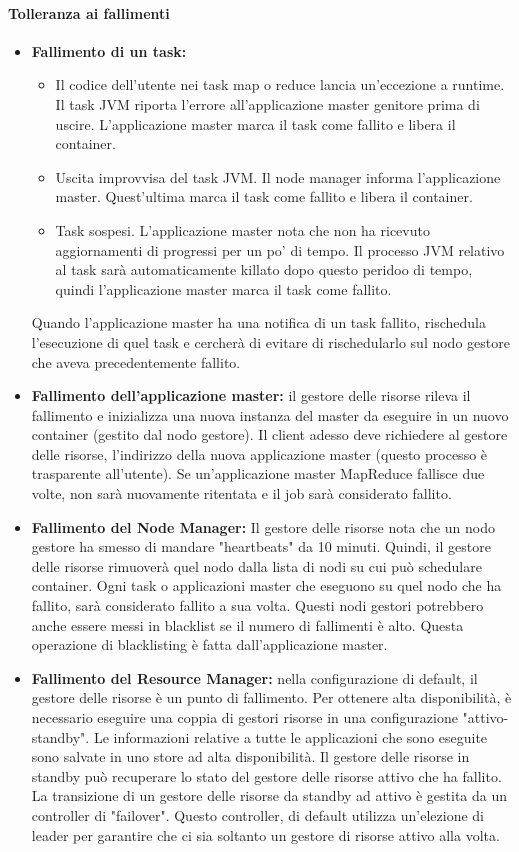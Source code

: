 \documentclass{article}
\begin{document}
\begin{appendices}
\paragraph{Tolleranza ai fallimenti}
\begin{itemize}
    \item \textbf{Fallimento di un task:} 
    \begin{itemize}
        \item Il codice dell'utente nei task map o reduce lancia un'eccezione a runtime. Il task JVM riporta l'errore all'applicazione master genitore prima di uscire. L'applicazione master marca il task come fallito e libera il container.
        \item Uscita improvvisa del task JVM. Il node manager informa l'applicazione master. Quest'ultima marca il task come fallito e libera il container.
        \item Task sospesi. L'applicazione master nota che non ha ricevuto aggiornamenti di progressi per un po' di tempo. Il processo JVM relativo al task sarà automaticamente killato dopo questo peridoo di tempo, quindi l'applicazione master marca il task come fallito.
    \end{itemize}
    Quando l'applicazione master ha una notifica di un task fallito, rischedula l'esecuzione di quel task e cercherà di evitare di rischedularlo sul nodo gestore che aveva precedentemente fallito.
    \item \textbf{Fallimento dell'applicazione master:} il gestore delle risorse rileva il fallimento e inizializza una nuova instanza del master da eseguire in un nuovo container (gestito dal nodo gestore). Il client adesso deve richiedere al gestore delle risorse, l'indirizzo della nuova applicazione master (questo processo è trasparente all'utente). Se un'applicazione master MapReduce fallisce due volte, non sarà nuovamente ritentata e il job sarà considerato fallito.
    \item \textbf{Fallimento del Node Manager:} Il gestore delle risorse nota che un nodo gestore ha smesso di mandare "heartbeats" da 10 minuti. Quindi, il gestore delle risorse rimuoverà quel nodo dalla lista di nodi su cui può schedulare container. Ogni task o applicazioni master che eseguono su quel nodo che ha fallito, sarà considerato fallito a sua volta. Questi nodi gestori potrebbero anche essere messi in blacklist se il numero di fallimenti è alto. Questa operazione di blacklisting è fatta dall'applicazione master.
    \item \textbf{Fallimento del Resource Manager:} nella configurazione di default, il gestore delle risorse è un punto di fallimento. Per ottenere alta disponibilità, è necessario eseguire una coppia di gestori risorse in una configurazione "attivo-standby". Le informazioni relative a tutte le applicazioni che sono eseguite sono salvate in uno store ad alta disponibilità. Il gestore delle risorse in standby può recuperare lo stato del gestore delle risorse attivo che ha fallito. La transizione di un gestore delle risorse da standby ad attivo è gestita da un controller di "failover". Questo controller, di default utilizza un'elezione di leader per garantire che ci sia soltanto un gestore di risorse attivo alla volta.

\end{itemize}
\end{appendices}
\end{document}
